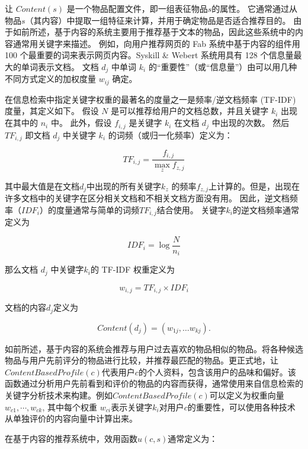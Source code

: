 \documentclass[sigconf]{acmart}
\begin{document}
让 $Content(s)$ 是一个物品配置文件，即一组表征物品$s$的属性。 它通常通过从物品$s$（其内容）中提取一组特征来计算，并用于确定物品是否适合推荐目的。 由于如前所述，基于内容的系统主要用于推荐基于文本的物品，因此这些系统中的内容通常用关键字来描述。 例如，向用户推荐网页的 Fab 系统中基于内容的组件用 100 个最重要的词来表示网页内容。Syskill \& Webert 系统用具有 128 个信息量最大的单词表示文档。 文档 $d_j$ 中单词 $k_i$ 的“重要性”（或“信息量”）由可以用几种不同方式定义的加权度量 $w_{ij}$ 确定。

在信息检索中指定关键字权重的最著名的度量之一是频率/逆文档频率 (TF-IDF) 度量，其定义如下。 假设 $N$ 是可以推荐给用户的文档总数，并且关键字 $k_i$ 出现在其中的 $n_i$ 中。 此外，假设 $f_{i,j}$ 是关键字 $k_i$ 在文档 $d_j$ 中出现的次数。 然后 $TF_{i,j}$ 即文档 $d_j$ 中关键字 $k_i$ 的词频（或归一化频率）定义为：

\begin{equation}
  T F_{i, j}=\frac{f_{i, j}}{\max _{z} f_{z, j}}
\end{equation}

其中最大值是在文档$d_j$中出现的所有关键字$k_z$ 的频率$f_{z,j}$上计算的。但是，出现在许多文档中的关键字在区分相关文档和不相关文档方面没有用。 因此，逆文档频率（$IDF_i$）的度量通常与简单的词频$TF_{i,j}$结合使用。 关键字$k_i$的逆文档频率通常定义为

\begin{equation}
  IDF_i=\log\frac{N}{n_i}
\end{equation}

那么文档 $d_j$ 中关键字$k_i$的 TF-IDF 权重定义为

\begin{equation}
  w_{i,j}=TF_{i,j}\times IDF_i
\end{equation}

文档的内容$d_j$定义为

\begin{equation}
  Content(d_j) = (w_{1j},\ldots w_{kj}).
\end{equation}

如前所述，基于内容的系统会推荐与用户过去喜欢的物品相似的物品。将各种候选物品与用户先前评分的物品进行比较，并推荐最匹配的物品。更正式地，让$ContentBasedProfile(c)$代表用户$c$的个人资料，包含该用户的品味和偏好。该函数通过分析用户先前看到和评价的物品的内容而获得，通常使用来自信息检索的关键字分析技术来构建。例如$ContentBasedProfile(c)$可以定义为权重向量$w_{c1}, \cdots , w_{ck}$, 其中每个权重 $w_{ci}$表示关键字$k_i$对用户$c$的重要性，可以使用各种技术从单独评价的内容向量中计算出来。

在基于内容的推荐系统中，效用函数$u(c,s)$通常定义为：
\end{document}

